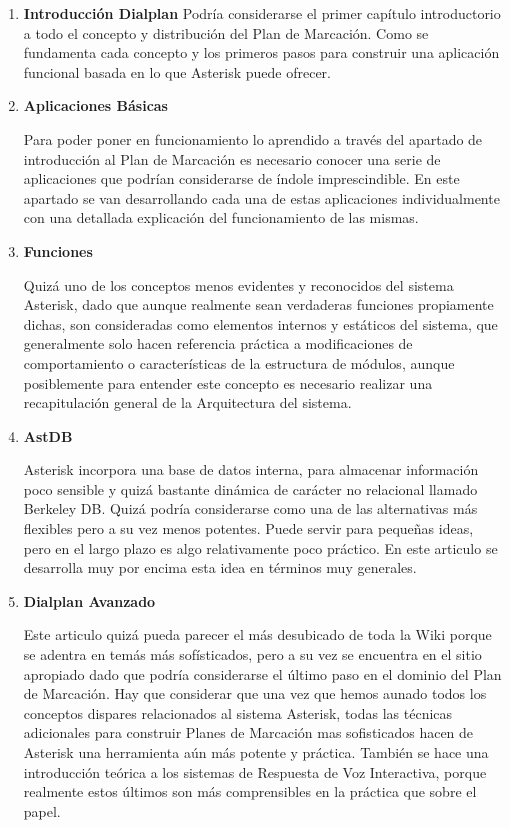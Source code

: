 \begin{enumerate}
	  \setlength{\itemsep}{10pt}

	\item \textbf{Introducción Dialplan}
	Podría considerarse el primer capítulo introductorio a todo el concepto y distribución del Plan de Marcación. Como se fundamenta cada concepto y los primeros pasos para construir una aplicación funcional basada en lo que Asterisk puede ofrecer. 
	
	\item \textbf{Aplicaciones Básicas}
	
	Para poder poner en funcionamiento lo aprendido a través del apartado de introducción al Plan de Marcación es necesario conocer una serie de aplicaciones que podrían considerarse de índole imprescindible. En este apartado se van desarrollando cada una de estas aplicaciones individualmente con una detallada explicación del funcionamiento de las mismas.
	
	\item \textbf{Funciones}
	
	Quizá uno de los conceptos menos evidentes y reconocidos del sistema Asterisk, dado que aunque realmente sean verdaderas funciones propiamente dichas, son consideradas como elementos internos y estáticos del sistema, que generalmente solo hacen referencia práctica a modificaciones de comportamiento o características de la estructura de módulos, aunque posiblemente para entender este concepto es necesario realizar una recapitulación general de la Arquitectura del sistema.
	
	\item \textbf{AstDB}
	
	Asterisk incorpora una base de datos interna, para almacenar información poco sensible y quizá bastante dinámica de carácter no relacional llamado Berkeley DB. Quizá podría considerarse como una de las alternativas más flexibles pero a su vez menos potentes. Puede servir para pequeñas ideas, pero en el largo plazo es algo relativamente poco práctico. En este articulo se desarrolla muy por encima esta idea en términos muy generales.
	
  \item \textbf{Dialplan Avanzado}
	
	Este articulo quizá pueda parecer el más desubicado de toda la Wiki porque se adentra en temás más sofísticados, pero a su vez se encuentra en el sitio apropiado dado que podría considerarse el último paso en el dominio del Plan de Marcación. Hay que considerar que una vez que hemos aunado todos los conceptos dispares relacionados al sistema Asterisk, todas las técnicas adicionales para construir Planes de Marcación mas sofisticados hacen de Asterisk una herramienta aún más potente y práctica. También se hace una introducción teórica a los sistemas de Respuesta de Voz Interactiva, porque realmente estos últimos son más comprensibles en la práctica que sobre el papel.
	
\end{enumerate}

